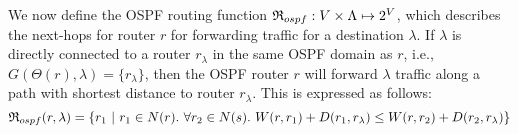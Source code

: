 We now define the OSPF routing function $\mathfrak{R}_{ospf}: 
V \times \Lambda \mapsto 2^V$, which describes the next-hops 
for router $r$ for forwarding traffic for a destination $\lambda$. 
If $\lambda$ is directly connected to a router $r_\lambda$ in the same OSPF domain as $r$, i.e., $G(\Theta(r),\lambda) = \{r_\lambda\}$, then 
the OSPF router $r$ will forward $\lambda$ traffic along a path with
shortest distance to router $r_\lambda$. This is expressed as follows: 
\[
\mathfrak{R}_{ospf}(r,\lambda) = \{r_1 ~|~ r_1 \in N(r).~\forall r_2 \in N(s) .~W(r, r_1) + D(r_1, r_\lambda) \le 
W(r, r_2) + D(r_2, r_\lambda)\}
\]
